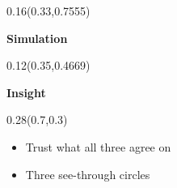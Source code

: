 \documentclass[aspectratio=169]{beamer}
\begin{document}
\begin{frame}[t]
\begin{textblock}{0.16}(0.33,0.7555)
{\centering\fontsize{15}{18}\selectfont \textcolor[HTML]{063B3B}{\textbf{Simulation}}\par}
\end{textblock}

\begin{textblock}{0.12}(0.35,0.4669)
{\centering\fontsize{14}{17}\selectfont \textcolor[HTML]{FFFFFF}{\textbf{Insight}}\par}
\end{textblock}

\begin{textblock}{0.28}(0.7,0.3)
{\raggedright\fontsize{14}{17}\selectfont \begin{itemize}
\item Trust what all three agree on
\item Three see-through circles
\end{itemize}\par}
\end{textblock}
\end{frame}
\end{document}
